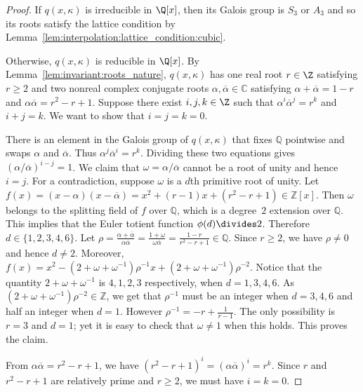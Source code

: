 \documentclass[11pt]{article}
\begin{document}
\begin{proof}
 If $q(x,\kappa)$ is irreducible in $\Q[x]$,
 then its Galois group is $S_3$ or $A_3$ and
 so its roots satisfy the lattice condition by Lemma~\ref{lem:interpolation:lattice_condition:cubic}.
 
 Otherwise,
 $q(x,\kappa)$ is reducible in $\Q[x]$.
 By Lemma~\ref{lem:invariant:roots_nature},
 $q(x,\kappa)$ has one real root $r \in \Z$ satisfying $r \ge 2$
 and two nonreal complex conjugate roots $\alpha, \overline{\alpha} \in \mathbb{C}$
 satisfying $\alpha + \overline{\alpha} = 1 - r$ and $\alpha \overline{\alpha} = r^2 - r + 1$.
 Suppose there exist $i,j,k \in \Z$ such that $\alpha^i \overline{\alpha}^j = r^k$ and $i + j = k$.
 We want to show that $i=j=k=0$.

 There is an element in the Galois group of $q(x,\kappa)$ that fixes $\mathbb{Q}$ pointwise and swaps $\alpha$ and $\overline{\alpha}$.
 Thus $\alpha^j \overline{\alpha}^i = r^k$.
 Dividing these two equations gives $(\alpha / \overline{\alpha})^{i-j} = 1$.
 We claim that $\omega = \alpha / \overline{\alpha}$ cannot be a root of unity and hence $i=j$.
 For a contradiction,
 suppose $\omega$ is a $d$th primitive root of unity.
 Let $f(x) = (x - \alpha) (x - \overline{\alpha}) = x^2 + (r-1) x + (r^2-r+1) \in \mathbb{Z}[x]$.
 Then $\omega$ belongs to the splitting field of $f$ over $\mathbb{Q}$,
 which is a degree~$2$ extension over $\mathbb{Q}$.
 This implies that the Euler totient function $\phi(d) \divides 2$.
 Therefore $d \in \{1,2,3,4,6\}$.
 Let $\rho = \frac{\alpha + \overline{\alpha}}{\alpha \overline{\alpha}} = \frac{1 + \omega}{\omega \overline{\alpha}} = \frac{1-r}{r^2-r+1} \in \mathbb{Q}$.
 Since $r \ge 2$,
 we have $\rho \neq 0$ and hence $d \neq 2$.
 Moreover, $f(x) = x^2 - (2 + \omega + \omega^{-1}) \rho^{-1} x + (2 + \omega + \omega^{-1}) \rho^{-2}$.
 Notice that the quantity $2 + \omega + \omega^{-1}$ is $4,1,2,3$ respectively, when $d = 1,3,4,6$.
 As $(2 + \omega + \omega^{-1}) \rho^{-2} \in \mathbb{Z}$,
 we get that $\rho^{-1}$ must be an integer when $d = 3,4,6$ and half an integer when $d = 1$.
 However $\rho^{-1} = -r + \frac{1}{r-1}$.
 The only possibility is $r = 3$ and $d = 1$;
 yet it is easy to check that $\omega \neq 1$ when this holds.
 This proves the claim.

 From $\alpha \overline{\alpha} = r^2 - r + 1$,
 we have $(r^2 - r + 1)^i = (\alpha \overline{\alpha})^i = r^k$.
 Since $r$ and $r^2 - r + 1$ are relatively prime and $r \ge 2$,
 we must have $i = k = 0$.
\end{proof}
\end{document}
